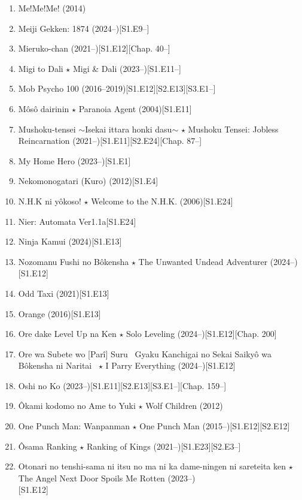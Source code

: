 \documentclass{article}
\begin{document}
\begin{enumerate}
    \item {\sc Me!Me!Me!} (2014)
    \item Meiji Gekken: 1874 (2024--)\hfill[S1.E9--]
    \item Mieruko-chan (2021--)\hfill[S1.E12][Chap. 40--]
    \item Migi to Dali $\star$ Migi \& Dali (2023--)\hfill[S1.E11--]
    \item Mob Psycho 100 (2016--2019)\hfill[S1.E12][S2.E13][S3.E1--]
    \item {\sc Môsô dairinin $\star$ Paranoia Agent} (2004)\hfill[S1.E11]
    \item Mushoku-tensei $\sim$Isekai ittara honki dasu$\sim$ $\star$ Mushoku Tensei: Jobless Reincarnation (2021--)\hfill[S1.E11][S2.E24][Chap. 87--]
    \item My Home Hero (2023--)\hfill[S1.E1]
    \item {\sc Nekomonogatari (Kuro)} (2012)[S1.E4]
    \item {\sc N.H.K ni yôkoso! $\star$ Welcome to the N.H.K.} (2006)\hfill[S1.E24]
    \item {\sc Nier: Automata Ver1.1a}\hfill[S1.E24]
    \item {\sc Ninja Kamui} (2024)\hfill[S1.E13]
    \item {\sc Nozomanu Fushi no Bôkensha $\star$ The Unwanted Undead Adventurer} (2024--)\hfill[S1.E12]
    \item {\sc Odd Taxi} (2021)\hfill[S1.E13]
    \item {\sc Orange} (2016)\hfill[S1.E13]
    \item {\sc Ore dake Level Up na Ken $\star$ Solo Leveling} (2024--)\hfill[S1.E12][Chap. 200]
    \item {\sc Ore wa Subete wo [Parî] Suru ~Gyaku Kanchigai no Sekai Saikyô wa Bôkensha ni Naritai~ $\star$ I Parry Everything} (2024--)\hfill[S1.E12]
    \item Oshi no Ko (2023--)\hfill[S1.E11][S2.E13][S3.E1--][Chap. 159--]
    \item {\sc \^Okami kodomo no Ame to Yuki $\star$ Wolf Children} (2012)
    \item One Punch Man: Wanpanman $\star$ One Punch Man (2015--)\hfill[S1.E12][S2.E12]
    \item \^Osama Ranking $\star$ Ranking of Kings (2021--)\hfill[S1.E23][S2.E3--]
    \item Otonari no tenshi-sama ni itsu no ma ni ka dame-ningen ni sareteita ken $\star$ The Angel Next Door Spoils Me Rotten (2023--)\\\mbox{}\hfill[S1.E12] 

\end{enumerate}
\end{document}
